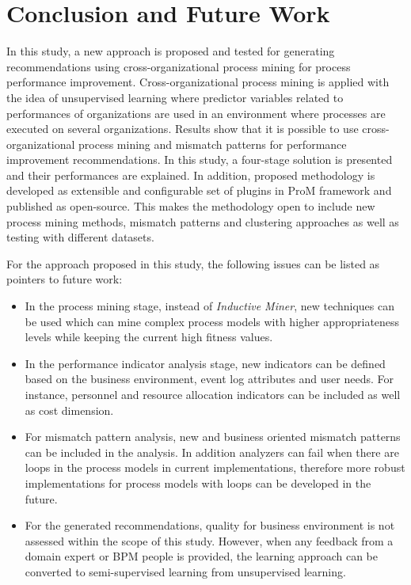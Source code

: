 \section{Conclusion and Future Work}
\label{sec:conclusion-and-future-work}

In this study, a new approach is proposed and tested for generating recommendations using cross-organizational process mining for process performance improvement. Cross-organizational process mining is applied with the idea of unsupervised learning where predictor variables related to performances of organizations are used in an environment where processes are executed on several organizations. Results show that it is possible to use cross-organizational process mining and mismatch patterns for performance improvement recommendations. In this study, a four-stage solution is presented and their performances are explained. In addition, proposed methodology is developed as extensible and configurable set of plugins in ProM framework \cite{verbeek2010prom} and published as open-source. This makes the methodology open to include new process mining methods, mismatch patterns and clustering approaches as well as testing with different datasets.

For the approach proposed in this study, the following issues can be listed as pointers to future work:
\begin{itemize}
	\item In the process mining stage, instead of \textit{Inductive Miner}, new techniques can be used which can mine complex process models with higher appropriateness levels while keeping the current high fitness values.
	\item In the performance indicator analysis stage, new indicators can be defined based on the business environment, event log attributes and user needs. For instance, personnel and resource allocation indicators can be included as well as cost dimension.
	\item For mismatch pattern analysis, new and business oriented mismatch patterns can be included in the analysis. In addition analyzers can fail when there are loops in the process models in current implementations, therefore more robust implementations for process models with loops can be developed in the future.
	\item For the generated recommendations, quality for business environment is not assessed within the scope of this study. However, when any feedback from a domain expert or BPM people is provided, the learning approach can be converted to semi-supervised learning from unsupervised learning.
\end{itemize}